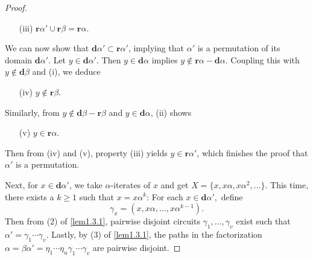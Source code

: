 \documentclass{surv-l}
\numberwithin{equation}{section}
\numberwithin{table}{section}
\numberwithin{figure}{section}
\theoremstyle{definition}
\begin{document}
\begin{proof}
\begin{enumerate}
\item[(iii)] $\mathbf{r}\alpha'\cup \mathbf{r}\beta=\mathbf{r}\alpha$.
\end{enumerate}
We can now show that $\mathbf{d}\alpha'\subset
\mathbf{r}\alpha'$, implying that $\alpha'$ is a
permutation of its domain $\mathbf{d}\alpha'$. Let $y\in
\mathbf{d}\alpha'$. Then $ y\in \mathbf{d}\alpha$ implies
$y\not\in \mathbf{r}\alpha-\mathbf{d}\alpha$. Coupling
this with $ y\not\in \mathbf{d}\beta$ and (i), we deduce
\begin{enumerate}
\item[(iv)] $y\not\in \mathbf{r}\beta$.
\end{enumerate}
Similarly, from $ y\not\in
\mathbf{d}\beta-\mathbf{r}\beta$ and $y\in
\mathbf{d}\alpha$, (ii) shows
\begin{enumerate}
\item[(v)] $ y\in \mathbf{r}\alpha$.
\end{enumerate}
Then from (iv) and (v), property (iii) yields $y\in
\mathbf{r}\alpha'$, which finishes the proof that $\alpha'$ is a
permutation.

Next, for $x\in \mathbf{d}\alpha'$, we take $\alpha$-iterates
of $x$ and get $X=\{x,x\alpha,x\alpha^{2},\ldots\}$. This
time, there exists a $k\geq 1$ such that $x=x\alpha^{k}$: For
each $x\in \mathbf{d}\alpha'$,~define
\[
\gamma_{x}=(x,x\alpha,\ldots, x\alpha^{k-1}).
\]
Then from (2) of \ref{lem1.3.1}, pairwise disjoint circuits
$\gamma_{1},\ldots, \gamma_{v}$ exist such that
$\alpha'=\gamma_{1}\cdots\gamma_{v}$. Lastly, by (3) of
\ref{lem1.3.1}, the paths in the factorization
$\alpha=\beta\alpha'=
\eta_{1}\cdots\eta_{u}\gamma_{1}\cdots\gamma_{v}$ are pairwise
disjoint.


\end{proof}
\end{document}
